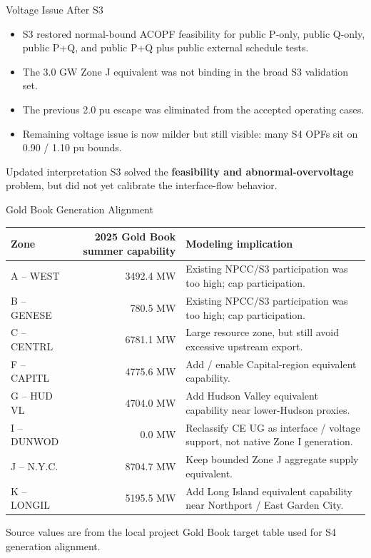 \documentclass[aspectratio=169,10pt]{beamer}
\begin{document}
\begin{frame}{Voltage Issue After S3}
\begin{itemize}
  \item S3 restored normal-bound ACOPF feasibility for public P-only, public Q-only, public P+Q, and public P+Q plus public external schedule tests.
  \item The 3.0 GW Zone J equivalent was not binding in the broad S3 validation set.
  \item The previous 2.0 pu escape was eliminated from the accepted operating cases.
  \item Remaining voltage issue is now milder but still visible: many S4 OPFs sit on 0.90 / 1.10 pu bounds.
\end{itemize}

\vspace{0.6em}
\begin{block}{Updated interpretation}
S3 solved the \textbf{feasibility and abnormal-overvoltage} problem, but did not yet calibrate the interface-flow behavior.
\end{block}
\end{frame}

\begin{frame}{Gold Book Generation Alignment}
\scriptsize
\begin{tabularx}{\linewidth}{l r X}
\toprule
\textbf{Zone} & \textbf{2025 Gold Book summer capability} & \textbf{Modeling implication} \\
\midrule
A -- WEST & 3492.4 MW & Existing NPCC/S3 participation was too high; cap participation. \\
B -- GENESE & 780.5 MW & Existing NPCC/S3 participation was too high; cap participation. \\
C -- CENTRL & 6781.1 MW & Large resource zone, but still avoid excessive upstream export. \\
F -- CAPITL & 4775.6 MW & Add / enable Capital-region equivalent capability. \\
G -- HUD VL & 4704.0 MW & Add Hudson Valley equivalent capability near lower-Hudson proxies. \\
I -- DUNWOD & 0.0 MW & Reclassify CE UG as interface / voltage support, not native Zone I generation. \\
J -- N.Y.C. & 8704.7 MW & Keep bounded Zone J aggregate supply equivalent. \\
K -- LONGIL & 5195.5 MW & Add Long Island equivalent capability near Northport / East Garden City. \\
\bottomrule
\end{tabularx}

\vspace{0.4em}
\footnotesize Source values are from the local project Gold Book target table used for S4 generation alignment.
\end{frame}
\end{document}
